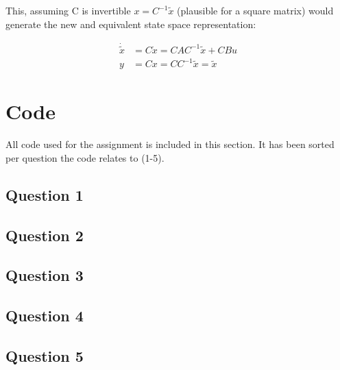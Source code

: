 \documentclass[a4paper, titlepage]{article}
\begin{document}
This, assuming C is invertible $x = C^{-1}\tilde{x}$ (plausible for a square matrix) would generate the new and equivalent state space representation:

\begin{equation}
\begin{split}
\dot{\tilde{x}} &= C\dot{x} = CAC^{-1}\tilde{x} + CBu \\
y &= Cx = CC^{-1}\tilde{x} = \tilde{x}
\end{split}
\end{equation}

\clearpage


\clearpage

\appendix

\section{Code}
All code used for the assignment is included in this section.
It has been sorted per question the code relates to (1-5).

\subsection{Question 1}

\clearpage

\subsection{Question 2}

\clearpage

\subsection{Question 3}

\clearpage

\subsection{Question 4}

\clearpage

\subsection{Question 5}

\clearpage
\end{document}
